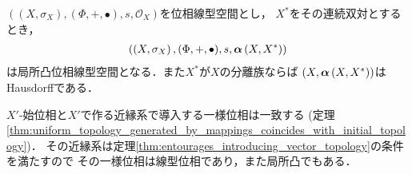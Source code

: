 	\begin{screen}
		\begin{thm}[弱位相は局所凸]
			$\left((X,\sigma_X),(\Phi,+,\bullet),s,\mathscr{O}_X\right)$を位相線型空間とし，
			$X^*$をその連続双対とするとき，
			\begin{align}
				\left(\left(X,\sigma_X\right),(\Phi,+,\bullet),s,{\boldsymbol \alpha} \left(X,X^*\right)\right)
			\end{align}
			は局所凸位相線型空間となる．また$X^*$が$X$の分離族ならば
			$\left(X,{\boldsymbol \alpha} \left(X,X^*\right)\right)$はHausdorffである．
		\end{thm}
	\end{screen}
	
	\begin{sketch}
		$X'$-始位相と$X'$で作る近縁系で導入する一様位相は一致する
		(定理\ref{thm:uniform_topology_generated_by_mappings_coincides_with_initial_topology})．
		その近縁系は定理\ref{thm:entourages_introducing_vector_topology}の条件を満たすので
		その一様位相は線型位相であり，また局所凸でもある．
		\QED
	\end{sketch}